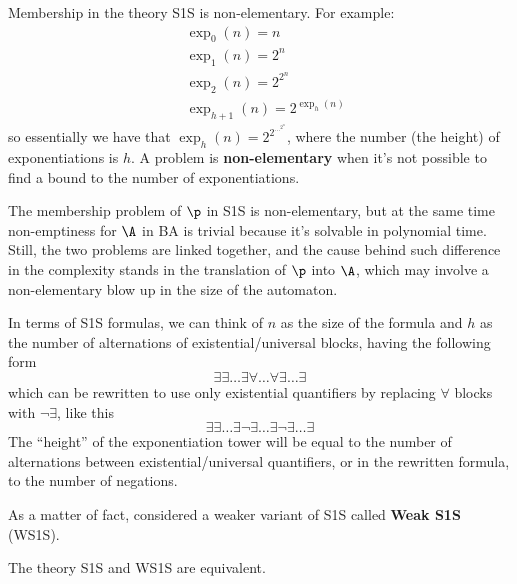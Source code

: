 \documentclass[oneside]{academica}
\begin{document}
Membership in the theory S1S is non-elementary.
For example:
\begin{align*}
  & \exp_0(n) = n \\
  & \exp_1(n) = 2^n \\
  & \exp_2(n) = 2^{2^n} \\
  & \exp_{h+1}(n) = 2^{\exp_h(n)}
\end{align*}
so essentially we have that $\exp_h(n) = 2^{2^{\dots^{2^n}}}$, where the number (the height) of exponentiations is $h$.
A problem is \textbf{non-elementary} when it's not possible to find a bound to the number of exponentiations.

The membership problem of $\p$ in S1S is non-elementary, but at the same time non-emptiness for $\A$ in BA is trivial because it's solvable in polynomial time.
Still, the two problems are linked together, and the cause behind such difference in the complexity stands in the translation of $\p$ into $\A$, which may involve a non-elementary blow up in the size of the automaton.

In terms of S1S formulas, we can think of $n$ as the size of the formula and $h$ as the number of alternations of existential/universal blocks, having the following form
\begin{equation*}
  \exists \exists \ldots \exists \forall \ldots \forall \exists \ldots \exists
\end{equation*}
which can be rewritten to use only existential quantifiers by replacing $\forall$ blocks with $\neg\exists$, like this
\begin{equation*}
  \exists \exists \ldots \exists \neg \exists \ldots \exists \neg \exists \ldots \exists
\end{equation*}
The ``height'' of the exponentiation tower will be equal to the number of alternations between existential/universal quantifiers, or in the rewritten formula, to the number of negations.

As a matter of fact, \Buchi considered a weaker variant of S1S called \textbf{Weak S1S} (WS1S).

\begin{theorem*}
  The theory S1S and WS1S are equivalent.
\end{theorem*}
\end{document}

